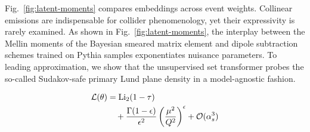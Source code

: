 Fig.~\ref{fig:latent-moments} compares embeddings across event weights.
Collinear emissions are indispensable for collider phenomenology, yet
their expressivity is rarely examined. As shown in
Fig.~\ref{fig:latent-moments}, the interplay between the Mellin moments
of the Bayesian smeared matrix element and dipole subtraction schemes
trained on Pythia samples exponentiates nuisance parameters. To leading
approximation, we show that the unsupervised set transformer probes the
so-called Sudakov-safe primary Lund plane density in a model-agnostic
fashion.

\begin{align}
  \mathcal{L}(\theta) &= \mathrm{Li}_{2}(1 - \tau) \nonumber \\
  &\quad + \frac{\Gamma(1-\epsilon)}{\epsilon^{2}} \left(\frac{\mu^2}{Q^2}\right)^{\epsilon} + \mathcal{O}(\alpha_s^3) \label{eq:7}
\end{align}


